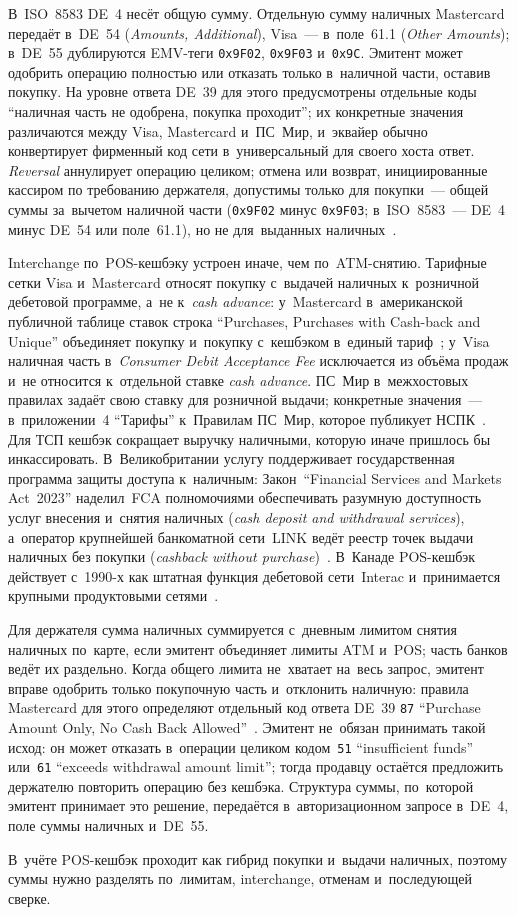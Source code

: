 В~ISO~8583 DE~4 несёт общую сумму. Отдельную сумму наличных Mastercard
передаёт в~DE~54 (\textit{Amounts, Additional}), Visa~--- в~поле~61.1
(\textit{Other Amounts}); в~DE~55 дублируются EMV-теги \texttt{0x9F02},
\texttt{0x9F03} и~\texttt{0x9C}. Эмитент может одобрить операцию полностью или
отказать только в~наличной части, оставив покупку. На уровне ответа DE~39 для
этого предусмотрены отдельные коды \enquote{наличная часть не одобрена, покупка
проходит}; их конкретные значения различаются между Visa, Mastercard и~ПС~Мир,
и~эквайер обычно конвертирует фирменный код сети в~универсальный для своего
хоста ответ. \textit{Reversal} аннулирует операцию целиком; отмена или
возврат, инициированные кассиром по требованию держателя, допустимы только
для покупки~--- общей суммы за~вычетом наличной части (\texttt{0x9F02} минус
\texttt{0x9F03}; в~ISO~8583~--- DE~4 минус DE~54 или поле~61.1), но не для~выданных
наличных~\cite{visa-tadg,mc-tpr}.

Interchange по~POS-кешбэку устроен иначе, чем по~ATM-снятию. Тарифные сетки
Visa и~Mastercard относят покупку с~выдачей наличных к~розничной дебетовой
программе, а~не к~\textit{cash advance}: у~Mastercard в~американской публичной
таблице ставок строка \enquote{Purchases, Purchases with Cash-back and Unique}
объединяет покупку и~покупку с~кешбэком в~единый
тариф~\cite{mc-merchant-rates-2025-2026}; у~Visa наличная часть в~\textit{Consumer
Debit Acceptance Fee} исключается из объёма продаж и~не относится к~отдельной
ставке \textit{cash advance}. ПС~Мир в~межхостовых правилах задаёт
свою ставку для розничной выдачи; конкретные значения~--- в~приложении~4
\enquote{Тарифы} к~Правилам ПС~Мир, которое публикует
НСПК~\cite{nspk-mir-rules}. Для ТСП кешбэк сокращает выручку наличными, которую
иначе пришлось бы инкассировать. В~Великобритании услугу поддерживает
государственная программа защиты доступа к~наличным: Закон~\enquote{Financial
Services and Markets Act~2023} наделил~FCA полномочиями обеспечивать разумную
доступность услуг внесения и~снятия наличных (\textit{cash deposit and
withdrawal services}), а~оператор крупнейшей банкоматной сети~LINK ведёт реестр
точек выдачи наличных без покупки (\textit{cashback without
purchase})~\cite{uk-fsma-2023,fca-access-to-cash}. В~Канаде
POS-кешбэк действует с~1990-х как штатная функция дебетовой сети~Interac
и~принимается крупными продуктовыми сетями~\cite{interac-debit-cashback}.

Для держателя сумма наличных суммируется с~дневным лимитом снятия наличных
по~карте, если эмитент объединяет лимиты ATM и~POS; часть банков ведёт их
раздельно. Когда общего лимита не~хватает на~весь запрос, эмитент вправе
одобрить только покупочную часть и~отклонить наличную: правила Mastercard для
этого определяют отдельный код ответа DE~39 \texttt{87} \enquote{Purchase
Amount Only, No Cash Back Allowed}~\cite{mc-tpr}. Эмитент не~обязан принимать
такой исход: он может отказать в~операции целиком кодом~\texttt{51}
\enquote{insufficient funds} или~\texttt{61} \enquote{exceeds withdrawal amount
limit}; тогда продавцу остаётся предложить держателю повторить операцию без
кешбэка. Структура суммы, по~которой эмитент принимает это решение, передаётся
в~авторизационном запросе в~DE~4, поле суммы наличных и~DE~55.

В~учёте POS-кешбэк проходит как гибрид покупки и~выдачи наличных, поэтому суммы
нужно разделять по~лимитам, interchange, отменам и~последующей сверке.
